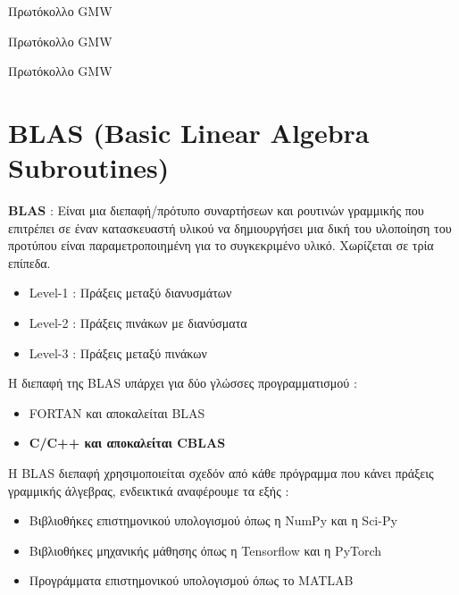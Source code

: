\documentclass[10pt]{beamer}
\begin{document}
    \begin{frame}{Πρωτόκολλο GMW}

    \end{frame}

    \begin{frame}{Πρωτόκολλο GMW}

    \end{frame}

    \begin{frame}{Πρωτόκολλο GMW}

    \end{frame}

    \section{BLAS (Basic Linear Algebra Subroutines)}
    \begin{frame}
    \begin{theorem}
        \textbf{BLAS} : Είναι μια διεπαφή/πρότυπο συναρτήσεων και ρουτινών γραμμικής που επιτρέπει σε έναν κατασκευαστή υλικού να δημιουργήσει μια δική του υλοποίηση του προτύπου είναι παραμετροποιημένη για το συγκεκριμένο υλικό. Χωρίζεται σε τρία επίπεδα.
        \begin{itemize}
            \item Level-1 : Πράξεις μεταξύ διανυσμάτων
            \item Level-2 : Πράξεις πινάκων με διανύσματα
            \item Level-3 : Πράξεις μεταξύ πινάκων
        \end{itemize}
    \end{theorem}
    H διεπαφή της BLAS υπάρχει για δύο γλώσσες προγραμματισμού :
    \begin{itemize}
        \item FORTAN και αποκαλείται BLAS
        \item \textbf{C/C++ και αποκαλείται CBLAS}
    \end{itemize}
    Η BLAS διεπαφή χρησιμοποιείται σχεδόν από κάθε πρόγραμμα που κάνει πράξεις γραμμικής άλγεβρας, ενδεικτικά αναφέρουμε τα εξής :
    \begin{itemize}
        \item Βιβλιοθήκες επιστημονικού υπολογισμού όπως η NumPy και η Sci-Py
        \item Βιβλιοθήκες μηχανικής μάθησης όπως η Tensorflow και η PyTorch
        \item Προγράμματα επιστημονικού υπολογισμού όπως το MATLAB
    \end{itemize}
    \end{frame}
\end{document}
